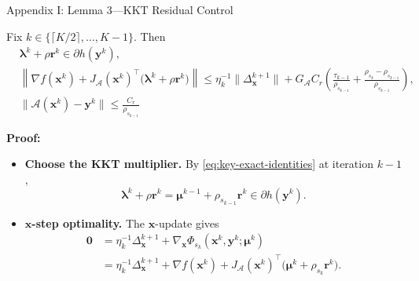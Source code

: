 \documentclass[handout,compress,9pt]{beamer}
\newcommand{\blue}[1]{\textcolor{ddlblue}{#1}}
\newcommand{\zero}{\bm{0}}
\newcommand{\bx}{\bm{x}}
\newcommand{\by}{\bm{y}}
\newcommand{\br}{\bm{r}}
\newcommand{\bmu}{\bm{\mu}}
\newcommand{\blmbd}{\bm{\lambda}}
\newcommand{\calA}{\mathcal{A}}
\begin{document}
\begin{frame}{Appendix I: Lemma 3---KKT Residual Control
\hfill\hyperlink{appendix:contents}{}}
\scriptsize

Fix $k\in\{\lceil K/2\rceil,\ldots,K-1\}$. Then
\begin{equation*}
\begin{aligned}
  &\blmbd^k+\rho\br^k\in\partial h(\by^k),\\
  &\left\|\nabla f(\bx^k)+J_{\calA}(\bx^k)^\top
  \bigl(\blmbd^k+\rho\br^k\bigr)\right\|
  \le \eta_k^{-1}\|\Delta_{\bx}^{k+1}\|
  +G_{\calA}C_r\left(
  \frac{\tau_{k-1}}{\rho_{s_{k-1}}}
  +\frac{\rho_{s_k}-\rho_{s_{k-1}}}{\rho_{s_{k-1}}}
  \right),\\
  &\|\calA(\bx^k)-\by^k\| \le\frac{C_r}{\rho_{s_{k-1}}}
\end{aligned}
\end{equation*}

\noindent\textbf{Proof:}
\begin{itemize}
\setlength{\itemsep}{0.06cm}
\item[\blue{$\triangleright$}]
\textbf{Choose the KKT multiplier.}
By \eqref{eq:key-exact-identities} at iteration $k-1$,
\begin{equation}\label{eq:kkt-multiplier}
  \blmbd^k+\rho\br^k
  =\bmu^{k-1}+\rho_{s_{k-1}}\br^k
  \in\partial h(\by^k).
\end{equation}

\item[\blue{$\triangleright$}]
\textbf{$\bx$-step optimality.}
The $\bx$-update gives
\begin{equation}\label{eq:kkt-x-optimality}
\begin{aligned}
  \zero
  &=\eta_k^{-1}\Delta_{\bx}^{k+1}
  +\nabla_{\bx}\Phi_{s_k}
  (\bx^k,\by^k;\bmu^k)\\
  &=\eta_k^{-1}\Delta_{\bx}^{k+1}
  +\nabla f(\bx^k)
  +J_{\calA}(\bx^k)^\top
  \bigl(\bmu^k+\rho_{s_k}\br^k\bigr).
\end{aligned}
\end{equation}


\end{itemize}
\end{frame}
\end{document}
